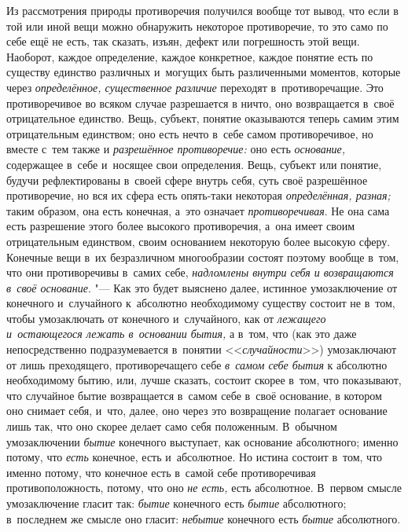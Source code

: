 Из рассмотрения природы противоречия получился вообще тот вывод, что если в
той или иной вещи можно обнаружить некоторое противоречие, то это само по
себе ещё не есть, так сказать, изъян, дефект или погрешность этой вещи.
Наоборот, каждое определение, каждое конкретное, каждое понятие есть по
существу единство различных и~могущих быть различенными моментов, которые
через {\em определённое, существенное различие}
переходят в~противоречащие. Это противоречивое во всяком случае разрешается
в ничто, оно возвращается в~своё отрицательное единство. Вещь, субъект,
понятие оказываются теперь самим этим отрицательным единством; оно есть
нечто в~себе самом противоречивое, но вместе с~тем также и
{\em разрешённое противоречие:} оно есть
{\em основание,} содержащее в~себе и~носящее свои
определения. Вещь, субъект или понятие, будучи рефлектированы в~своей сфере
внутрь себя, суть своё разрешённое противоречие, но вся их сфера есть
опять-таки некоторая {\em определённая, разная;} таким
образом, она есть конечная, а~это означает
{\em противоречивая}. Не она сама есть разрешение этого
более высокого противоречия, а~она имеет своим отрицательным единством,
своим основанием некоторую более высокую сферу. Конечные вещи в~их
безразличном многообразии состоят поэтому вообще в~том, что они
противоречивы в~самих себе, {\em надломлены внутри себя
и возвращаются в~своё основание}. "--- Как это будет выяснено далее, истинное
умозаключение от конечного и~случайного к~абсолютно необходимому существу
состоит не в~том, чтобы умозаключать от конечного и~случайного, как от
{\em лежащего и~остающегося лежать в~основании бытия,}
а в~том, что (как это даже непосредственно подразумевается в~понятии
<<{\em случайности}>>) умозаключают от лишь преходящего,
противоречащего себе {\em в~самом себе бытия} к
абсолютно необходимому бытию, или, лучше сказать, состоит скорее в~том, что
показывают, что случайное бытие возвращается в~самом себе в~своё основание,
в котором оно снимает себя, и~что, далее, оно через это возвращение
полагает основание лишь так, что оно скорее делает само себя положенным.
В~обычном умозаключении {\em бытие} конечного выступает,
как основание абсолютного; именно потому, что
{\em есть} конечное, есть и~абсолютное. Но истина
состоит в~том, что именно потому, что конечное есть в~самой себе
противоречивая противоположность, потому, что оно
{\em не есть,} есть абсолютное. В~первом смысле
умозаключение гласит так: {\em бытие} конечного есть
{\em бытие} абсолютного; в~последнем же смысле оно
гласит: {\em небытие} конечного есть {\em бытие} абсолютного.
